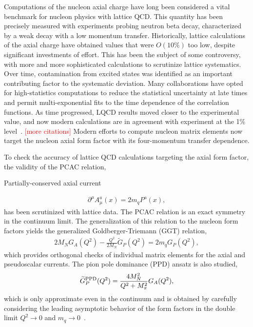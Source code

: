 Computations of the nucleon axial charge have long been considered
 a vital benchmark for nucleon physics with lattice QCD.
This quantity has been precisely measured with experiments probing neutron beta decay,
 characterized by a weak decay with a low momentum transfer.
Historically, lattice calculations of the axial charge have obtained values
 that were $O(10\%)$ too low, despite significant investments of effort.
This has been the subject of some controversy,
 with more and more sophisticated calculations to scrutinize lattice systematics.
Over time, contamination from excited states was identified as
 an important contributing factor to the systematic deviation.
Many collaborations have opted for high-statistics computations
 to reduce the statistical uncertainty at late times and permit
 multi-exponential fits to the time dependence of the correlation functions.
As time progressed, LQCD results moved closer to the experimental value,
 and now modern calculations are in agreement with experiment
 at the 1\% level~\cite{Kronfeld:2019nfb}.
\textcolor{red}{[more citations]}
Modern efforts to compute nucleon matrix elements now target the nucleon
 axial form factor with its four-momentum transfer dependence.

To check the accuracy of lattice QCD calculations targeting the axial form factor,
 the validity of the PCAC relation,
\begin{marginnote}
  {Partially-conserved} axial current
\end{marginnote}
\begin{align}
 \partial^\mu A^{a}_{\mu}(x) = 2 m_q P^{a}(x),
 \label{eq:pcac}
\end{align}
 has been scrutinized with lattice data.
The PCAC relation is an exact symmetry in the continuum limit.
The generalization of this relation to the nucleon form factors
 yields the generalized Goldberger-Triemann (GGT) relation,
\begin{align}
 2 M_N G_A(Q^2) -\frac{Q^2}{2M_N} \widetilde{G}_P(Q^2) = 2 m_q G_{P}(Q^2),
 \label{eq:ggt}
\end{align}
 which provides orthogonal checks of individual matrix elements
 for the axial and pseudoscalar currents.
The pion pole dominance (PPD) ansatz is also studied,
\begin{align}
 \widetilde{G}^{\rm PPD}_P(Q^2) = \frac{4M_N^2}{Q^2+M_\pi^2} G_A(Q^2),
 \label{eq:ppd}
\end{align}
 which is only approximate even in the continuum and is obtained
 by carefully considering the leading asymptotic behavior of the
 form factors in the double limit $Q^2\to0$ and $m_q\to0$~\cite{Sasaki:2007gw}.

